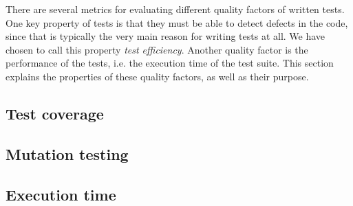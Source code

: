 
There are several metrics for evaluating different quality factors of
written tests. One key property of tests is that they must be able to
detect defects in the code, since that is typically the very main reason
for writing tests at all. We have chosen to call this property
\emph{test efficiency}. Another quality factor is the performance of the
tests, i.e. the execution time of the test suite. This section explains
the properties of these quality factors, as well as their purpose.\\

\subsection{Test coverage}
\label{sec:coverage}


\subsection{Mutation testing}
\label{sec:theory_mutation}


\subsection{Execution time}


